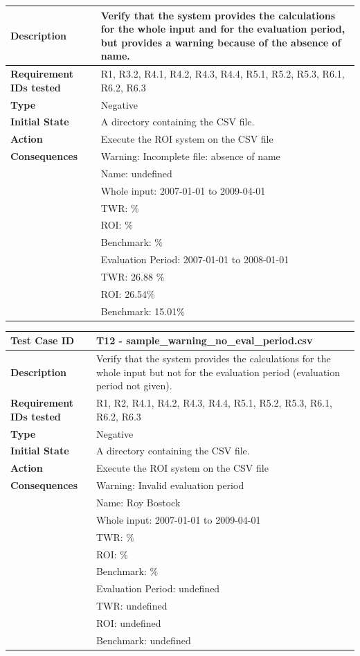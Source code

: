 \documentclass[runningheads,12pt]{article}
\begin{document}
{\begin{tabular}{|p{1.2in}|p{4in}|}
\hline
\textbf{Description} & Verify that the system provides the calculations for the whole input and for the evaluation period, but provides a warning because of the absence of name.\\
\hline
\textbf{Requirement IDs tested} & R1, R3.2, R4.1, R4.2, R4.3, R4.4, R5.1, R5.2, R5.3, R6.1, R6.2, R6.3 \\ 
\hline
\textbf{Type} & Negative \\ 
\hline
\textbf{Initial State} & A directory containing the CSV file.\\
\hline 
\textbf{Action} & Execute the ROI system on the CSV file \\
\hline 
\textbf{Consequences} & Warning: Incomplete file: absence of name\\
& Name: undefined\\
& Whole input: 2007-01-01 to 2009-04-01\\
& TWR:  $\%$\\
& ROI: $\%$\\
& Benchmark: $\%$ \\ 
& Evaluation Period: 2007-01-01 to 2008-01-01\\
& TWR: 26.88 $\%$\\
& ROI: 26.54$\%$\\
& Benchmark: 15.01$\%$ \\ 
\hline
\end{tabular}
\bigskip
\centering
\begin{tabular}{|p{1.2in}|p{4in}|}
\hline
\textbf{Test Case ID} & T12 - sample\_warning\_no\_eval\_period.csv \\ 
\hline
\textbf{Description} & Verify that the system provides the calculations for the whole input but not for the evaluation period (evaluation period not given).\\
\hline
\textbf{Requirement IDs tested} & R1, R2, R4.1, R4.2, R4.3, R4.4, R5.1, R5.2, R5.3, R6.1, R6.2, R6.3 \\ 
\hline
\textbf{Type} & Negative \\ 
\hline
\textbf{Initial State} & A directory containing the CSV file.\\
\hline 
\textbf{Action} & Execute the ROI system on the CSV file \\
\hline 
\textbf{Consequences} & Warning: Invalid evaluation period\\
& Name: Roy Bostock\\
& Whole input: 2007-01-01 to 2009-04-01\\
& TWR:  $\%$\\
& ROI: $\%$\\
& Benchmark: $\%$ \\ 
& Evaluation Period: undefined\\
& TWR: undefined\\
& ROI: undefined\\
& Benchmark: undefined \\ 
\hline
\end{tabular}
}
\end{document}
